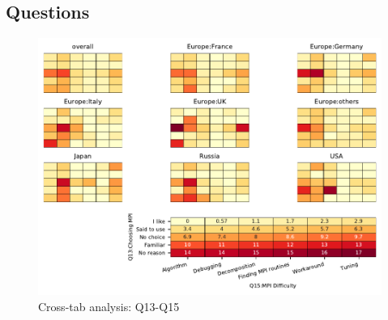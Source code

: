 
\subsection{Questions}


\begin{figure}
\begin{center}
\includegraphics[width=12cm]{../pdfs/Q13-Q15.pdf}
\caption{Cross-tab analysis: Q13-Q15}
\label{fig:Q13-Q15}
\end{center}
\end{figure}
